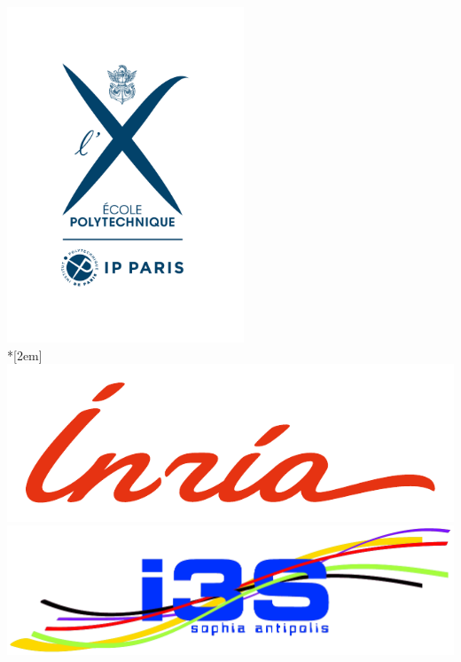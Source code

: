 \begin{titlepage}
  \vfill
  \centering
  \includegraphics[height=100mm]{figures/Ecole_polytechnique_signature}\\*[2em]
  \includegraphics[width=.3\paperwidth]{figures/inr_logo_rouge_rvb}
  \hspace*{2em}
  \includegraphics[width=.3\paperwidth]{figures/NewlogoI3S}\\[-5em]
\end{titlepage}


\makeatletter
\clearpage
\thispagestyle{empty}
\vspace*{\fill}
\noindent\@author\\[0.2em]
\noindent\textbf{\@title}

